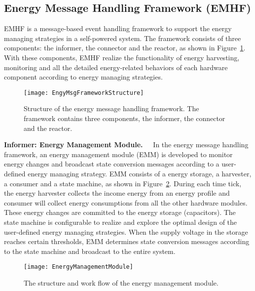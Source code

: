 \subsection{Energy Message Handling Framework (EMHF)}	\label{sec:tech-EMHF}
EMHF is a message-based event handling framework to support the energy managing strategies in a self-powered system.
The framework consists of three components: the informer, the connector and the reactor, as shown in Figure~\ref{fig:EngyMsgFrameworkStructure}. 
With these components, EMHF realize the functionality of energy harvesting, monitoring and all the detailed energy-related behaviors of each hardware component according to energy managing strategies.

\begin{figure}[!htpb]
	\centering
	\texttt{[image: EngyMsgFrameworkStructure]}
	\vspace{-5pt}
	\caption{Structure of the energy message handling framework. The framework contains three components, the informer, the connector and the reactor.}		\label{fig:EngyMsgFrameworkStructure}
\end{figure}

\textbf{Informer: Energy Management Module.\ \ }
In the energy message handling framework, an energy management module (EMM) is developed to monitor energy changes and broadcast state conversion messages according to a user-defined energy managing strategy.
EMM consists of a energy storage, a harvester, a consumer and a state machine, as shown in Figure~\ref{fig:EnergyManagementModule}. 
During each time tick, the energy harvester collects the income energy from an energy profile and consumer will collect energy consumptions from all the other hardware modules. 
These energy changes are committed to the energy storage (capacitors). 
The state machine is configurable to realize and explore the optimal design of the user-defined energy managing strategies. 
When the supply voltage in the storage reaches certain thresholds, EMM determines state conversion messages according to the state machine and broadcast to the entire system.

\begin{figure}[!htpb]
	\centering
	\vspace{-5pt}
	\texttt{[image: EnergyManagementModule]}
	\vspace{-10pt}
	\caption{The structure and work flow of the energy management module.}		\label{fig:EnergyManagementModule}
\end{figure}

